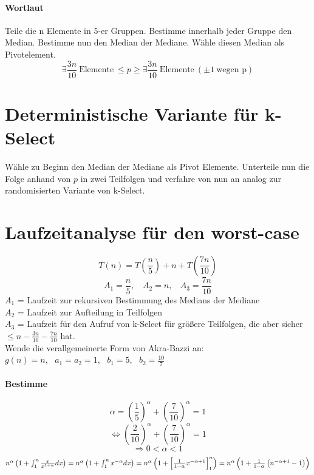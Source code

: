 \vspace{20pt}
\paragraph{Wortlaut}
Teile die n Elemente in 5-er Gruppen. Bestimme innerhalb jeder Gruppe den Median. Bestimme nun den Median der Mediane. Wähle diesen Median als Pivotelement.
\[\exists \frac{3n}{10}~\text{Elemente}~\leq p \geq \exists \frac{3n}{10}~\text{Elemente}~(\pm 1~\text{wegen p})\]
\vspace{1pt}




\section{Deterministische Variante für k-Select}
Wähle zu Beginn den Median der Mediane als Pivot Elemente. Unterteile nun die Folge anhand von $p$ in zwei Teilfolgen und verfahre von nun an analog zur randomisierten Variante von k-Select.

\section{Laufzeitanalyse für den worst-case}
\[T(n) = T\left(\frac{n}{5}\right)+n+T \left(\frac{7n}{10} \right) \]
\[A_1 = \frac{n}{5},~~~~A_2 = n,~~~~A_3= \frac{7n}{10}\]
$A_1$ = Laufzeit zur rekursiven Bestimmung des Medians der Mediane\\
$A_2$ = Laufzeit zur Aufteilung in Teilfolgen\\
$A_3$ = Laufzeit für den Aufruf von k-Select  für größere Teilfolgen, die aber sicher $\leq n - \frac{3n}{10} - \frac{7n}{10}$ hat.\\

Wende die verallgemeinerte Form von Akra-Bazzi an:\\
$g(n)=n, ~~~a_1=a_2=1, ~~~b_1=5, ~~~b_2=\frac{10}{7}$\\
\paragraph{Bestimme}
\[\alpha = \left(\frac{1}{5}\right)^{\alpha} + \left(\frac{7}{10}\right)^{\alpha} = 1\]
\[\Leftrightarrow \left(\frac{2}{10}\right)^{\alpha} + \left(\frac{7}{10}\right)^{\alpha} = 1\]
\[\Rightarrow 0 < \alpha < 1 \]
	\[\textstyle\centering n^{\alpha}\left(1+\int_1^n \frac{x}{x^{1+\alpha}} dx\right) = n^{\alpha}\left(1+\int_1^n x^{-\alpha} dx\right) = n^{\alpha}\left(1+ \left[\frac{1}{1-\alpha} x^{-\alpha+1} \right]_1^n\right) = n^{\alpha}\left(1+\frac{1}{1-\alpha} \left(n^{-\alpha+1}-1\right)\right)\]

